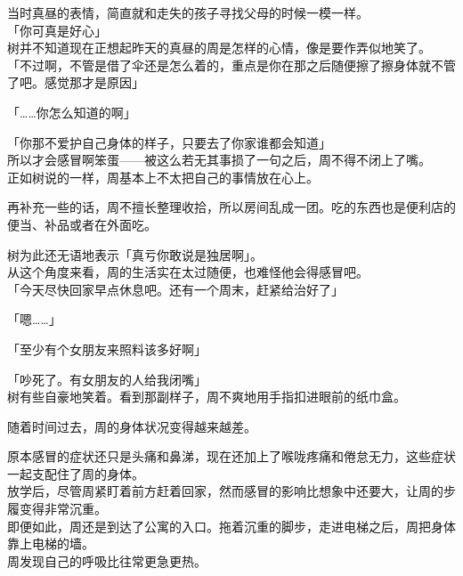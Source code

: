 当时真昼的表情，简直就和走失的孩子寻找父母的时候一模一样。\\

「你可真是好心」\\

树并不知道现在正想起昨天的真昼的周是怎样的心情，像是要作弄似地笑了。\\

「不过啊，不管是借了伞还是怎么着的，重点是你在那之后随便擦了擦身体就不管了吧。感觉那才是原因」

「……你怎么知道的啊」

「你那不爱护自己身体的样子，只要去了你家谁都会知道」\\

所以才会感冒啊笨蛋——被这么若无其事损了一句之后，周不得不闭上了嘴。\\

正如树说的一样，周基本上不太把自己的事情放在心上。

再补充一些的话，周不擅长整理收拾，所以房间乱成一团。吃的东西也是便利店的便当、补品或者在外面吃。

树为此还无语地表示「真亏你敢说是独居啊」。\\

从这个角度来看，周的生活实在太过随便，也难怪他会得感冒吧。\\

「今天尽快回家早点休息吧。还有一个周末，赶紧给治好了」

「嗯……」

「至少有个女朋友来照料该多好啊」

「吵死了。有女朋友的人给我闭嘴」\\

树有些自豪地笑着。看到那副样子，周不爽地用手指扣进眼前的纸巾盒。\\

\vspace{2\baselineskip}

随着时间过去，周的身体状况变得越来越差。

原本感冒的症状还只是头痛和鼻涕，现在还加上了喉咙疼痛和倦怠无力，这些症状一起支配住了周的身体。\\

放学后，尽管周紧盯着前方赶着回家，然而感冒的影响比想象中还要大，让周的步履变得非常沉重。\\

即便如此，周还是到达了公寓的入口。拖着沉重的脚步，走进电梯之后，周把身体靠上电梯的墙。\\

周发现自己的呼吸比往常更急更热。\\

